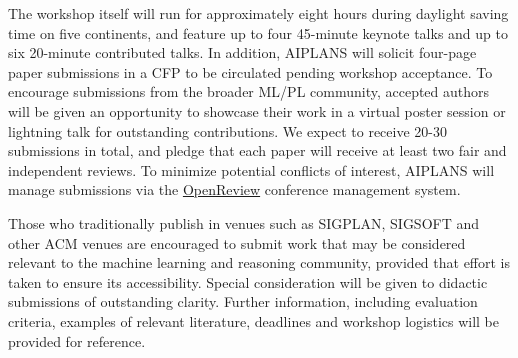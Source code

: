 \documentclass{article}
\begin{document}



    The workshop itself will run for approximately eight hours during daylight saving time on five continents, and feature up to four 45-minute keynote talks and up to six 20-minute contributed talks. In addition, AIPLANS will solicit four-page paper submissions in a CFP to be circulated pending workshop acceptance. To encourage submissions from the broader ML/PL community, accepted authors will be given an opportunity to showcase their work in a virtual poster session or lightning talk for outstanding contributions. We expect to receive 20-30 submissions in total, and pledge that each paper will receive at least two fair and independent reviews. To minimize potential conflicts of interest, AIPLANS will manage submissions via the \href{https://openreview.net}{OpenReview} conference management system.





    Those who traditionally publish in venues such as SIGPLAN, SIGSOFT and other ACM venues are encouraged to submit work that may be considered relevant to the machine learning and reasoning community, provided that effort is taken to ensure its accessibility. Special consideration will be given to didactic submissions of outstanding clarity. Further information, including evaluation criteria, examples of relevant literature, deadlines and workshop logistics will be provided for reference.

\end{document}
